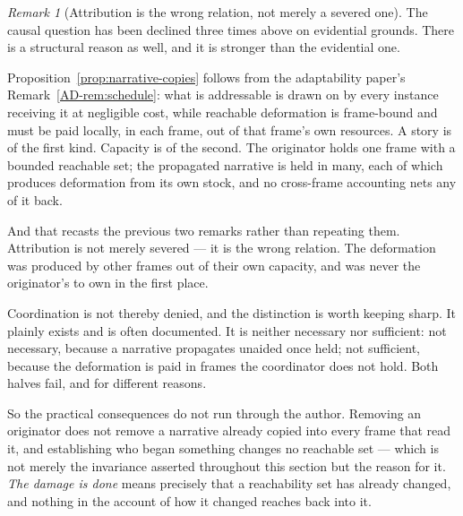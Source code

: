 \documentclass[11pt,a4paper]{article}
\theoremstyle{remark}
\newtheorem{remark}[definition]{Remark}
\begin{document}
\begin{remark}[Attribution is the wrong relation, not merely a severed one]\label{rem:propagate}
The causal question has been declined three times above on evidential grounds. There is a
structural reason as well, and it is stronger than the evidential one.

Proposition~\ref{prop:narrative-copies} follows from the adaptability paper's
Remark~\ref{AD-rem:schedule}: what is addressable is drawn on by every instance receiving it at
negligible cost, while reachable deformation is frame-bound and must be paid locally, in each frame, out
of that frame's own resources. A story is of the first kind. Capacity is of the second. The originator
holds one frame with a bounded reachable set; the propagated narrative is held in many, each of which
produces deformation from its own stock, and no cross-frame accounting nets any of it back.

And that recasts the previous two remarks rather than repeating them. Attribution is not merely
severed --- it is the wrong relation. The deformation was produced by other frames out of their
own capacity, and was never the originator's to own in the first place.

Coordination is not thereby denied, and the distinction is worth keeping sharp. It plainly exists
and is often documented. It is neither necessary nor sufficient: not necessary, because a
narrative propagates unaided once held; not sufficient, because the deformation is paid in frames the
coordinator does not hold. Both halves fail, and for different reasons.

So the practical consequences do not run through the author. Removing an originator does not
remove a narrative already copied into every frame that read it, and establishing who began
something changes no reachable set --- which is not merely the invariance asserted throughout this
section but the reason for it. \emph{The damage is done} means precisely that a reachability set has
already changed, and nothing in the account of how it changed reaches back into it.
\end{remark}
\end{document}
